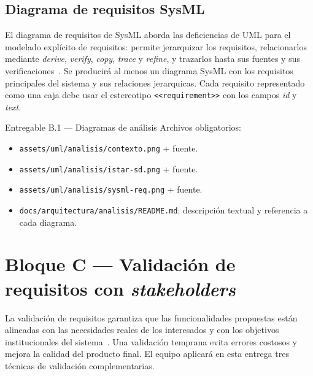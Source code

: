 \documentclass[11pt,a4paper]{article}
\begin{document}
\subsection{Diagrama de requisitos SysML}

El diagrama de requisitos de SysML aborda las deficiencias de UML para el modelado expl\'icito de requisitos: permite jerarquizar los requisitos, relacionarlos mediante \emph{derive}, \emph{verify}, \emph{copy}, \emph{trace} y \emph{refine}, y trazarlos hasta sus fuentes y sus verificaciones~\cite{hause2006sysml,weilkiens2011sysml}. Se producir\'a al menos un diagrama SysML con los requisitos principales del sistema y sus relaciones jerarquicas. Cada requisito representado como una caja debe usar el estereotipo \texttt{<<requirement>>} con los campos \emph{id} y \emph{text}.

\begin{cajaentregable}{Entregable B.1 --- Diagramas de an\'alisis}
Archivos obligatorios:
\begin{itemize}
    \item \texttt{assets/uml/analisis/contexto.png} + fuente.
    \item \texttt{assets/uml/analisis/istar-sd.png} + fuente.
    \item \texttt{assets/uml/analisis/sysml-req.png} + fuente.
    \item \texttt{docs/arquitectura/analisis/README.md}: descripci\'on textual y referencia a cada diagrama.
\end{itemize}
\end{cajaentregable}

\section{Bloque C --- Validaci\'on de requisitos con \emph{stakeholders}}

La validaci\'on de requisitos garantiza que las funcionalidades propuestas est\'an alineadas con las necesidades reales de los interesados y con los objetivos institucionales del sistema~\cite{sommerville2011software,wiegers2013software,dick2017requirements}. Una validaci\'on temprana evita errores costosos y mejora la calidad del producto final. El equipo aplicar\'a en esta entrega tres t\'ecnicas de validaci\'on complementarias.
\end{document}

